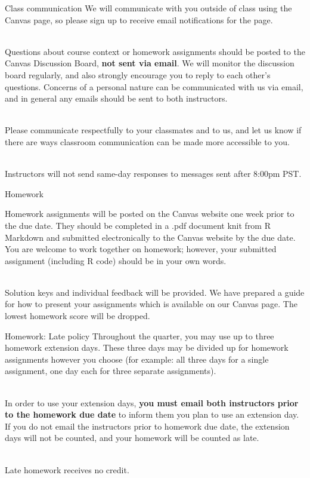 \documentclass[10pt,t]{beamer}
\begin{document}
\begin{frame}{Class communication}
We will communicate with you outside of class using the Canvas page, so please sign up to receive email notifications for the page. \\~\

Questions about course context or homework assignments should be posted to the Canvas Discussion Board, \textbf{not sent via email}. We will monitor the discussion board regularly, and also strongly encourage you to reply to each other’s questions. Concerns of a personal nature can be communicated with us via email, and in general any emails should be sent to both instructors. \\~\

Please communicate respectfully to your classmates and to us, and let us know if there are ways classroom communication can be made more accessible to you. \\~\

Instructors will not send same-day responses to messages sent after 8:00pm PST.
\end{frame}

\begin{frame}{Homework}

Homework assignments will be posted on the Canvas website one week 
prior to the due date. They should be completed in a .pdf document knit from R 
Markdown and submitted electronically to the Canvas website by the due date. You are 
welcome to work together on homework; however, your submitted assignment 
(including R code) should be in your own words. \\~\

Solution keys and individual feedback 
will be provided. We have prepared a guide for how to present your assignments which 
is available on our Canvas page. The lowest homework score will be dropped.

\end{frame}

\begin{frame}{Homework: Late policy}
Throughout the quarter, you may use up to three homework 
extension days. These three days may be divided up for homework assignments however you choose (for example: all three days for a single assignment, one day each for three separate assignments). \\~\

In order to use your extension days, \textbf{you must email both instructors prior to the homework due date} to inform them you plan to use an extension day. If you do not email the instructors prior to homework due date, the extension days will not be counted, and your homework will be counted as late. \\~\

Late homework receives no credit.

\end{frame}
\end{document}
